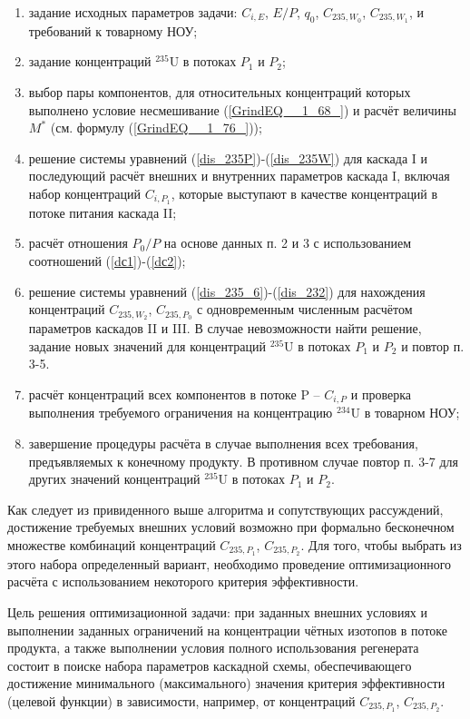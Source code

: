 \begin{enumerate}
    \item задание исходных параметров задачи: $C_{i,E}$, $E/P$, $q_0$, $C_{235,{W_0}}$, $C_{235,{W_1}}$, и требований к товарному НОУ;
    \item задание концентраций $^{235}$U в потоках $P_1$ и $P_2$;
    \item выбор пары компонентов, для относительных концентраций которых выполнено условие несмешивание (\ref{GrindEQ__1_68_}) и расчёт величины $M^{*}$ (см. формулу (\ref{GrindEQ__1_76_}));
    \item решение системы уравнений (\ref{dis_235P})-(\ref{dis_235W}) для каскада I и последующий расчёт внешних и внутренних параметров каскада I, включая набор концентраций $C_{i,{P_1}}$, которые выступают в качестве концентраций в потоке питания каскада II;
    \item расчёт отношения ${P_0}/P$ на основе данных п. 2 и 3 с использованием соотношений (\ref{dс1})-(\ref{dс2});
    \item решение системы уравнений (\ref{dis_235_6})-(\ref{dis_232}) для нахождения концентраций $C_{235,{W_2}}$, $C_{235,{P_0}}$ с одновременным численным расчётом параметров каскадов II и III. В случае невозможности найти решение, задание новых значений для концентраций $^{235}$U в потоках $P_1$ и $P_2$ и повтор п. 3-5. 
    \item расчёт концентраций всех компонентов в потоке P -- $C_{i, P}$ и проверка выполнения требуемого ограничения на концентрацию $^{234}$U в товарном НОУ;
    \item завершение процедуры расчёта в случае выполнения всех требования, предъявляемых к конечному продукту. В противном случае повтор п. 3-7 для других значений концентраций $^{235}$U в потоках $P_1$ и $P_2$.
\end{enumerate}

Как следует из привиденного выше алгоритма и сопутствующих рассуждений, достижение требуемых внешних условий возможно при формально бесконечном множестве комбинаций концентраций $C_{235,{P_1}}$, $C_{235,{P_2}}$. Для того, чтобы выбрать из этого набора определенный вариант, необходимо проведение оптимизационного расчёта с использованием некоторого критерия эффективности. 

Цель решения оптимизационной задачи: при заданных внешних условиях и выполнении заданных ограничений на концентрации чётных изотопов в потоке продукта, а также выполнении условия полного использования регенерата состоит в поиске набора параметров каскадной схемы, обеспечивающего достижение минимального (максимального) значения критерия эффективности (целевой функции) в зависимости, например, от концентраций $C_{235,{P_1}}$, $C_{235,{P_2}}$.

